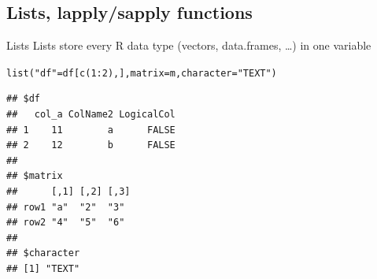 \documentclass[xcolor=table,           xcolor=dvipsnames]{beamer}\usepackage[]{graphicx}\usepackage[]{color}
\makeatletter
\newcommand{\hlnum}[1]{\textcolor[rgb]{0,0,0}{#1}}
\newcommand{\hlstr}[1]{\textcolor[rgb]{0.545,0.137,0.137}{#1}}
\newcommand{\hlopt}[1]{\textcolor[rgb]{0,0,0}{#1}}
\newcommand{\hlstd}[1]{\textcolor[rgb]{0,0,0}{#1}}
\newcommand{\hlkwc}[1]{\textcolor[rgb]{1,0,1}{#1}}
\newcommand{\hlkwd}[1]{\textcolor[rgb]{0,0,1}{#1}}
\newenvironment{kframe}{%
 \def\at@end@of@kframe{}%
 \ifinner\ifhmode%
  \def\at@end@of@kframe{\end{minipage}}%
  \begin{minipage}{\columnwidth}%
 \fi\fi%
 \def\FrameCommand##1{\hskip\@totalleftmargin \hskip-\fboxsep
 \colorbox{shadecolor}{##1}\hskip-\fboxsep
     \hskip-\linewidth \hskip-\@totalleftmargin \hskip\columnwidth}%
 \MakeFramed {\advance\hsize-\width
   \@totalleftmargin\z@ \linewidth\hsize
   \@setminipage}}%
 {\par\unskip\endMakeFramed%
 \at@end@of@kframe}
\newenvironment{knitrout}{}{} %
\makeatother
\begin{document}
\subsection{Lists, lapply/sapply functions}

\begin{frame}[fragile]{Lists}
Lists store every R data type (vectors, data.frames, \ldots) in one variable
\begin{knitrout}\small
{}\color{fgcolor}\begin{kframe}
\begin{alltt}
\hlkwd{list}\hlstd{(}\hlstr{"df"}\hlstd{=df[}\hlkwd{c}\hlstd{(}\hlnum{1}\hlopt{:}\hlnum{2}\hlstd{), ],} \hlkwc{matrix}\hlstd{=m,} \hlkwc{character}\hlstd{=}\hlstr{"TEXT"}\hlstd{)}
\end{alltt}
\begin{verbatim}
## $df
##   col_a ColName2 LogicalCol
## 1    11        a      FALSE
## 2    12        b      FALSE
## 
## $matrix
##      [,1] [,2] [,3]
## row1 "a"  "2"  "3" 
## row2 "4"  "5"  "6" 
## 
## $character
## [1] "TEXT"
\end{verbatim}
\end{kframe}
\end{knitrout}
\end{frame}

\end{document}
